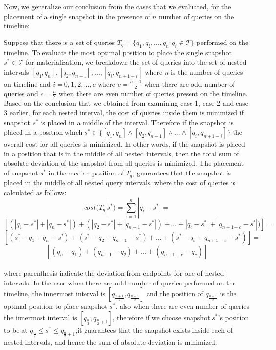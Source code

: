 Now, we generalize our conclusion from the cases that we evaluated, for the placement of a single snapshot in the presence of $n$ number of queries on the timeline: 

Suppose that there is a set of queries $T_q=\{q_1,q_2,...,q_n:q_i \in \mathcal{T}\}$ performed on the timeline. To evaluate the most optimal position to place the single snapshot $s^* \in \mathcal{T}$ for materialization, we breakdown the set of queries into the set of nested intervals $[q_1,q_n],[q_2,q_{n-1}],...,[q_i,q_{n+1-i}]$ where $n$ is the number of queries on timeline and $i=0,1,2,...,c$ where $c=\frac{n+1}{2}$ when there are odd number of queries and $c=\frac{n}{2}$ when there are even number of queries present on the timeline.\\ 
Based on the conclusion that we obtained from examining case 1, case 2 and case 3 earlier, for each nested interval, the cost of queries inside them is minimized if snapshot $s^*$ is placed in a middle of the interval. Therefore if the snapshot is placed in a position which $s^*\in \{ [q_1,q_n] \wedge [q_2,q_{n-1}] \wedge ... \wedge [q_i,q_{n+1-i}] \}$ the overall cost for all queries is minimized. In other words, if the snapshot is placed in a position that is in the middle of all nested intervals, then the total sum of absolute deviation of the snapshot from all queries is minimized. The placement of snapshot $s^*$ in the median position of $T_q$, guarantees that the snapshot is placed in the middle of all nested query intervals, where the cost of queries is calculated as follows:
$$cost(T_q|s^*)=\sum_{i=1}^n |q_i-s^*| = $$
$$[(|q_1-s^*|+|q_n-s^*|)+(|q_2-s^*|+|q_{n-1}-s^*|)+...+|q_c-s^*|+|q_{n+1-c}-s^*|)]=$$
$$[(s^*-q_1+q_n-s^*)+(s^*-q_2+q_{n-1}-s^*)+...+(s^*-q_c+q_{n+1-c}-s^*)]=$$
$$[(q_n-q_1)+(q_{n-1}-q_2)+...+(q_{n+1-c}-q_c)]$$\\
where parenthesis indicate the deviation from endpoints for one of nested intervals. In the case when there are odd number of queries performed on the timeline, the innermost interval is $[q_{\frac{n+1}{2}},q_{\frac{n+1}{2}}]$ and the position of $q_{\frac{n+1}{2}}$ is the optimal position to place snapshot $s^*$. also when there are even number of queries the innermost interval is $[q_{\frac{n}{2}},q_{\frac{n}{2}+1}]$, therefore if we choose snapshot $s^*$'s position to be at $q_{\frac{n}{2}}\leq s^*\leq q_{\frac{n}{2}+1}$,it guarantees that the snapshot exists inside each of nested intervals, and hence the sum of absolute deviation is minimized. \\

